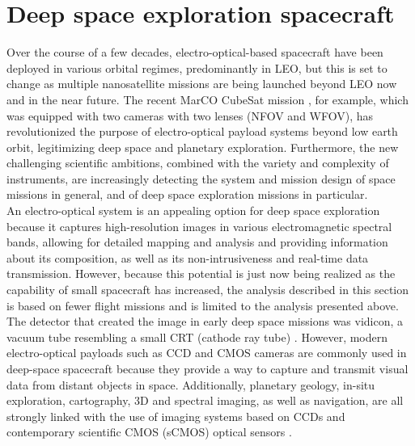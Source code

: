 \documentclass[final,5p,times,twocolumn,authoryear]{elsarticle}
\begin{document}
\section{Deep space exploration spacecraft}
Over the course of a few decades, electro-optical-based spacecraft have been deployed in various orbital regimes, predominantly in LEO, but this is set to change as multiple nanosatellite missions are being launched beyond LEO now and in the near future. The recent MarCO CubeSat mission \citep{schoolcraft2017marco}, for example, which was equipped with two cameras with two lenses (NFOV and WFOV), has revolutionized the purpose of electro-optical payload systems beyond low earth orbit, legitimizing deep space and planetary exploration.   Furthermore, the new challenging scientific ambitions, combined with the variety and complexity of instruments, are increasingly detecting the system and mission design of space missions in general, and of deep space exploration missions in particular. \\
An electro-optical system is an appealing option for deep space exploration because it captures high-resolution images in various electromagnetic spectral bands, allowing for detailed mapping and analysis and providing information about its composition, as well as its non-intrusiveness and real-time data transmission. However, because this potential is just now being realized as the capability of small spacecraft has increased, the analysis described in this section is based on fewer flight missions and is limited to the analysis presented above.\\
The detector that created the image in early deep space missions was vidicon, a vacuum tube resembling a small CRT (cathode ray tube) \citep{nas2023}. However, modern electro-optical payloads such as CCD and CMOS cameras are commonly used in deep-space spacecraft because they provide a way to capture and transmit visual data from distant objects in space. Additionally, planetary geology, in-situ exploration, cartography, 3D and spectral imaging, as well as navigation, are all strongly linked with the use of imaging systems based on CCDs and contemporary scientific CMOS (sCMOS) optical sensors \citep{Behnke2015IMAGINGSF}.
\end{document}
